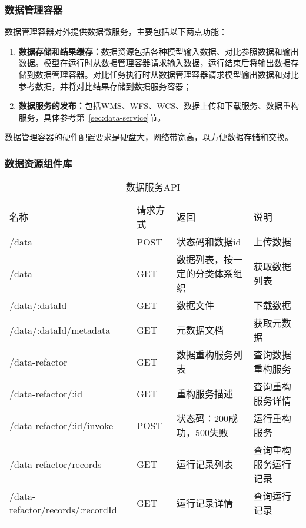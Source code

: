\subsubsection{数据管理容器}
数据管理容器对外提供数据微服务，主要包括以下两点功能：
\begin{enumerate}[(1)]
\item \textbf{数据存储和结果缓存：}数据资源包括各种模型输入数据、对比参照数据和输出数据。模型在运行时从数据管理容器请求输入数据，运行结束后将输出数据存储到数据管理容器。对比任务执行时从数据管理容器请求模型输出数据和对比参考数据，并将对比结果存储到数据服务容器；
\item \textbf{数据服务的发布：}包括WMS、WFS、WCS、数据上传和下载服务、数据重构服务，具体参考第~\ref{sec:data-service}节。
\end{enumerate}

数据管理容器的硬件配置要求是硬盘大，网络带宽高，以方便数据存储和交换。

\subsubsection{数据资源组件库}

\noindent\begin{table}[!htbp]
    \centering
    \caption{数据服务API}
    \label{tab:data-service-API}
    \begin{tabular}{llll}
        \Xhline{1.5pt}
        名称 & 请求方式 & 返回 & 说明 \\
        \Xhline{1.5pt}
        /data & POST & 状态码和数据id & 上传数据 \\
        /data & GET & \multicolumn{1}{m{0.24\columnwidth}}{数据列表，按一定的分类体系组织} & 获取数据列表 \\
        /data/:dataId & GET & 数据文件 & 下载数据 \\
        /data/:dataId/metadata & GET & 元数据文档 & 获取元数据 \\
        /data-refactor & GET & 数据重构服务列表 & \multicolumn{1}{m{0.18\columnwidth}}{查询数据重构服务} \\
        /data-refactor/:id & GET & 重构服务描述 & \multicolumn{1}{m{0.18\columnwidth}}{查询重构服务详情} \\
        /data-refactor/:id/invoke & POST & \multicolumn{1}{m{0.24\columnwidth}}{状态码：200成功，500失败} & 运行重构服务 \\
        /data-refactor/records & GET & 运行记录列表 & \multicolumn{1}{m{0.18\columnwidth}}{查询重构服务运行记录} \\
        /data-refactor/records/:recordId & GET & 运行记录详情 & 查询运行记录 \\
        \Xhline{1.5pt}
    \end{tabular}
\end{table}

